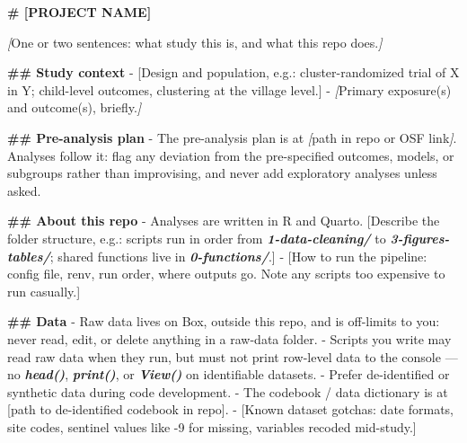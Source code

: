 \documentclass[
]{book}
\newenvironment{Shaded}{\begin{snugshade}}{\end{snugshade}}
\newcommand{\CommentTok}[1]{\textcolor[rgb]{0.56,0.35,0.01}{\textit{#1}}}
\newcommand{\FunctionTok}[1]{\textcolor[rgb]{0.13,0.29,0.53}{\textbf{#1}}}
\newcommand{\InformationTok}[1]{\textcolor[rgb]{0.56,0.35,0.01}{\textbf{\textit{#1}}}}
\newcommand{\NormalTok}[1]{#1}
\newcommand{\OtherTok}[1]{\textcolor[rgb]{0.56,0.35,0.01}{#1}}
\newcommand{\SpecialStringTok}[1]{\textcolor[rgb]{0.31,0.60,0.02}{#1}}
\begin{document}
\begin{Shaded}
\begin{Highlighting}[]
\FunctionTok{\# [PROJECT NAME]}

\CommentTok{[}\OtherTok{One or two sentences: what study this is, and what this repo does.}\CommentTok{]}

\FunctionTok{\#\# Study context}
\SpecialStringTok{{-} }\NormalTok{[Design and population, e.g.: cluster{-}randomized trial of X in Y;}
\NormalTok{  child{-}level outcomes, clustering at the village level.]}
\SpecialStringTok{{-} }\CommentTok{[}\OtherTok{Primary exposure(s) and outcome(s), briefly.}\CommentTok{]}

\FunctionTok{\#\# Pre{-}analysis plan}
\SpecialStringTok{{-} }\NormalTok{The pre{-}analysis plan is at }\CommentTok{[}\OtherTok{path in repo or OSF link}\CommentTok{]}\NormalTok{. Analyses}
\NormalTok{  follow it: flag any deviation from the pre{-}specified outcomes,}
\NormalTok{  models, or subgroups rather than improvising, and never add}
\NormalTok{  exploratory analyses unless asked.}

\FunctionTok{\#\# About this repo}
\SpecialStringTok{{-} }\NormalTok{Analyses are written in R and Quarto. [Describe the folder}
\NormalTok{  structure, e.g.: scripts run in order from }\InformationTok{\textasciigrave{}1{-}data{-}cleaning/\textasciigrave{}}\NormalTok{ to}
  \InformationTok{\textasciigrave{}3{-}figures{-}tables/\textasciigrave{}}\NormalTok{; shared functions live in }\InformationTok{\textasciigrave{}0{-}functions/\textasciigrave{}}\NormalTok{.]}
\SpecialStringTok{{-} }\NormalTok{[How to run the pipeline: config file, renv, run order, where}
\NormalTok{  outputs go. Note any scripts too expensive to run casually.]}

\FunctionTok{\#\# Data}
\SpecialStringTok{{-} }\NormalTok{Raw data lives on Box, outside this repo, and is off{-}limits to you:}
\NormalTok{  never read, edit, or delete anything in a raw{-}data folder.}
\SpecialStringTok{{-} }\NormalTok{Scripts you write may read raw data when they run, but must not}
\NormalTok{  print row{-}level data to the console — no }\InformationTok{\textasciigrave{}head()\textasciigrave{}}\NormalTok{, }\InformationTok{\textasciigrave{}print()\textasciigrave{}}\NormalTok{, or}
  \InformationTok{\textasciigrave{}View()\textasciigrave{}}\NormalTok{ on identifiable datasets.}
\SpecialStringTok{{-} }\NormalTok{Prefer de{-}identified or synthetic data during code development.}
\SpecialStringTok{{-} }\NormalTok{The codebook / data dictionary is at [path to de{-}identified}
\NormalTok{  codebook in repo].}
\SpecialStringTok{{-} }\NormalTok{[Known dataset gotchas: date formats, site codes, sentinel values}
\NormalTok{  like {-}9 for missing, variables recoded mid{-}study.]}


\end{Highlighting}
\end{Shaded}
\end{document}
